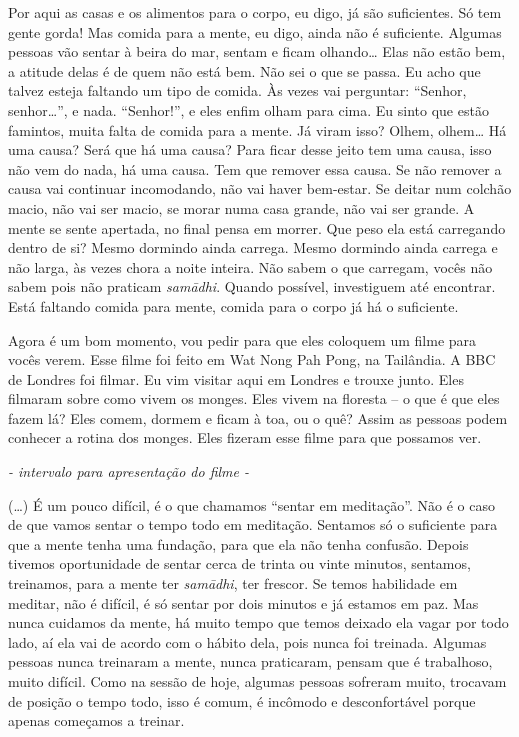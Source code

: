Por aqui as casas e os alimentos para o corpo, eu digo, já são
suficientes. Só tem gente gorda! Mas comida para a mente, eu digo,
ainda não é suficiente. Algumas pessoas vão sentar à beira do mar,
sentam e ficam olhando… Elas não estão bem, a atitude delas é de quem
não está bem. Não sei o que se passa. Eu acho que talvez esteja
faltando um tipo de comida. Às vezes vai perguntar: “Senhor, senhor…”,
e nada. “Senhor!”, e eles enfim olham para cima. Eu sinto que estão
famintos, muita falta de comida para a mente. Já viram isso? Olhem,
olhem… Há uma causa? Será que há uma causa? Para ficar desse jeito tem
uma causa, isso não vem do nada, há uma causa. Tem que remover essa
causa. Se não remover a causa vai continuar incomodando, não vai haver
bem-estar. Se deitar num colchão macio, não vai ser macio, se morar
numa casa grande, não vai ser grande. A mente se sente apertada, no
final pensa em morrer. Que peso ela está carregando dentro de si? Mesmo
dormindo ainda carrega. Mesmo dormindo ainda carrega e não larga, às
vezes chora a noite inteira. Não sabem o que carregam, vocês não sabem
pois não praticam \textit{sam\=adhi}. Quando possível, investiguem até
encontrar. Está faltando comida para mente, comida para o corpo já há o
suficiente.

Agora é um bom momento, vou pedir para que eles coloquem um filme
para vocês verem. Esse filme foi feito em Wat Nong Pah Pong, na
Tailândia. A BBC de Londres foi filmar. Eu vim visitar aqui em Londres
e trouxe junto. Eles filmaram sobre como vivem os monges. Eles vivem na
floresta – o que é que eles fazem lá? Eles comem, dormem e ficam à toa,
ou o quê? Assim as pessoas podem conhecer a rotina dos monges. Eles
fizeram esse filme para que possamos ver. 

{\itshape
{}- intervalo para apresentação do filme -}

(…) É um pouco difícil, é o que chamamos “sentar em meditação”. Não
é o caso de que vamos sentar o tempo todo em meditação. Sentamos só o
suficiente para que a mente tenha uma fundação, para que ela não tenha
confusão. Depois tivemos oportunidade de sentar cerca de trinta ou
vinte minutos, sentamos, treinamos, para a mente ter
\textit{sam\=adhi}, ter frescor. Se temos habilidade em meditar, não é
difícil, é só sentar por dois minutos e já estamos em paz. Mas nunca
cuidamos da mente, há muito tempo que temos deixado ela vagar por todo
lado, aí ela vai de acordo com o hábito dela, pois nunca foi treinada.
Algumas pessoas nunca treinaram a mente, nunca praticaram, pensam que é
trabalhoso, muito difícil. Como na sessão de hoje, algumas pessoas
sofreram muito, trocavam de posição o tempo todo, isso é comum, é
incômodo e desconfortável porque apenas começamos a treinar.

